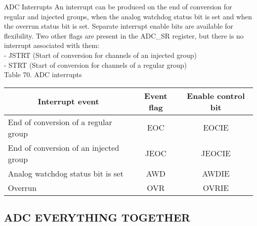 \begin{theorem}{ADC Interrupts}
    An interrupt can be produced on the end of conversion for regular and injected groups, when the analog watchdog status bit is set and when the overrun status bit is set. Separate interrupt enable bits are available for flexibility.
Two other flags are present in the ADC\_SR register, but there is no interrupt associated with them:\\
- JSTRT (Start of conversion for channels of an injected group)\\
- STRT (Start of conversion for channels of a regular group)
\vspace{1mm}\\
Table 70. ADC interrupts\\
\begin{tabular}{|l|c|c|}
\hline \multicolumn{1}{|c|}{ Interrupt event } & Event flag & Enable control bit \\
\hline End of conversion of a regular group & EOC & EOCIE \\
\hline End of conversion of an injected group & JEOC & JEOCIE \\
\hline Analog watchdog status bit is set & AWD & AWDIE \\
\hline Overrun & OVR & OVRIE \\
\hline
\end{tabular}
\end{theorem}

\subsection{ADC EVERYTHING TOGETHER}

